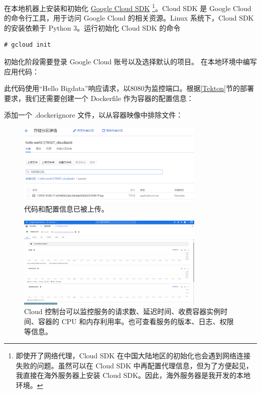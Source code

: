 \documentclass[11pt]{article}
\begin{document}
在本地机器上安装和初始化 \href{https://cloud.google.com/sdk/docs}{Google Cloud SDK} \footnote{即使开了网络代理，Cloud SDK 在中国大陆地区的初始化也会遇到网络连接失败的问题。虽然可以在 Cloud SDK 中再配置代理信息，但为了方便起见，我直接在海外服务器上安装 Cloud SDK。因此，海外服务器是我开发的本地环境。}。Cloud SDK 是 Google Cloud 的命令行工具，用于访问 Google Cloud 的相关资源。Linux 系统下，Cloud SDK 的安装依赖于 Python 3。运行初始化 Cloud SDK 的命令
\begin{lstlisting}
# gcloud init
\end{lstlisting}
初始化阶段需要登录 Google Cloud 账号以及选择默认的项目。
在本地环境中编写应用代码：


此代码使用“Hello Bigdata”响应请求，以8080为监控端口。根据\ref{Tekton}节的部署要求，我们还需要创建一个 Dockerfile 作为容器的配置信息：


添加一个 .dockerignore 文件，以从容器映像中排除文件：


\begin{figure}[!htbp]
	\centering
	\includegraphics[width=0.8\textwidth]{figs/cloudrun_submit.png}
	\caption{代码和配置信息已被上传。}
	\label{cloudrun_submit.png}
\end{figure}
\begin{figure}[!htbp]
	\centering
	\includegraphics[width=0.8\textwidth]{figs/cloudrun_complete.png}
	\caption{Cloud 控制台可以监控服务的请求数、延迟时间、收费容器实例时间、容器的 CPU 和内存利用率。也可查看服务的版本、日志、权限等信息。}
	\label{cloudrun_complete.png}
\end{figure}
\end{document}
